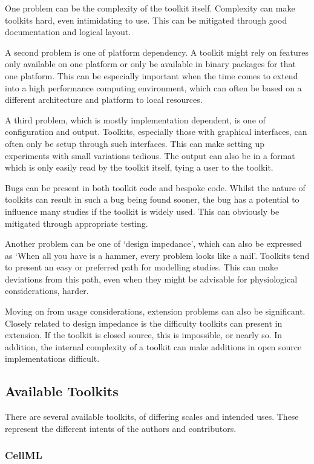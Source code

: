 One problem can be the complexity of the toolkit itself.
Complexity can make toolkits hard, even intimidating to use.
This can be mitigated through good documentation and logical layout.

A second problem is one of platform dependency.
A toolkit might rely on features only available on one platform or only be
available in binary packages for that one platform.
This can be especially important when the time comes to extend into a high
performance computing environment, which can often be based on a different
architecture and platform to local resources.

A third problem, which is mostly implementation dependent, is one of
configuration and output.
Toolkits, especially those with graphical interfaces, can often only be setup
through such interfaces.
This can make setting up experiments with small variations tedious.
The output can also be in a format which is only easily read by the toolkit
itself, tying a user to the toolkit.

Bugs can be present in both toolkit code and bespoke code.
Whilst the nature of toolkits can result in such a bug being found sooner, the
bug has a potential to influence many studies if the toolkit is widely used.
This can obviously be mitigated through appropriate testing.

Another problem can be one of `design impedance', which can also be expressed as
`When all you have is a hammer, every problem looks like a nail'.
Toolkits tend to present an easy or preferred path for modelling studies.
This can make deviations from this path, even when they might be advisable for
physiological considerations, harder.

Moving on from usage considerations, extension problems can also be significant.
Closely related to design impedance is the difficulty toolkits can present in
extension.
If the toolkit is closed source, this is impossible, or nearly so.
In addition, the internal complexity of a toolkit can make additions in open
source implementations difficult.

\subsection{Available Toolkits}

There are several available toolkits, of differing scales and intended uses.
These represent the different intents of the authors and contributors.

\subsubsection{CellML}

